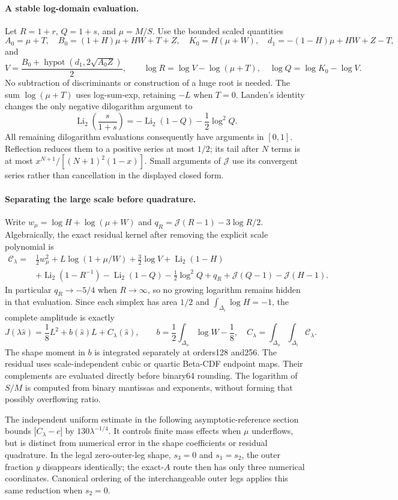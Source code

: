\paragraph{A stable log-domain evaluation.}
Let $R=1+r$, $Q=1+s$, and $\mu=M/S$. Use the bounded scaled quantities
\[
 A_0=\mu+T,\quad B_0=(1+H)\mu+HW+T+Z,\quad K_0=H(\mu+W),
 \quad d_1=-(1-H)\mu+HW+Z-T,
\]
and
\[
 V=\frac{B_0+\operatorname{hypot}(d_1,2\sqrt{A_0Z})}{2},\qquad
 \log R=\log V-\log(\mu+T),\quad \log Q=\log K_0-\log V.
\]
No subtraction of discriminants or construction of a huge root is needed.
The sum $\log(\mu+T)$ uses log-sum-exp, retaining $-L$ when $T=0$.
Landen's identity changes the only negative dilogarithm argument to
\[
 \operatorname{Li}_2\left(\frac{s}{1+s}\right)
 =-\operatorname{Li}_2(1-Q)-\frac12\log^2Q.
\]
All remaining dilogarithm evaluations consequently have arguments in
$[0,1]$. Reflection reduces them to a positive series at most $1/2$; its
tail after $N$ terms is at most
$x^{N+1}/[(N+1)^2(1-x)]$. Small arguments of $\mathcal J$ use its
convergent series rather than cancellation in the displayed closed form.

\paragraph{Separating the large scale before quadrature.}
Write $w_\mu=\log H+\log(\mu+W)$ and
$q_R=\mathcal J(R-1)-3\log R/2$. Algebraically, the exact residual kernel
after removing the explicit scale polynomial is
\begin{align*}
 \mathcal C_\lambda={}&\frac12w_\mu^2
 +L\log(1+\mu/W)+\frac32\log V+\operatorname{Li}_2(1-H)\\
 &+\operatorname{Li}_2(1-R^{-1})-\operatorname{Li}_2(1-Q)
 -\frac12\log^2Q+q_R+\mathcal J(Q-1)-\mathcal J(H-1).
\end{align*}
In particular $q_R\to-5/4$ when $R\to\infty$, so no growing logarithm
remains hidden in that evaluation. Since each simplex has area $1/2$ and
$\int_{\Delta_i}\log H=-1$, the complete amplitude is exactly
\[
 J(\lambda\widehat s)=\frac18L^2+b(\widehat s)L+C_\lambda(\widehat s),
 \qquad
 b=\frac12\int_{\Delta_o}\log W-\frac18,
 \quad C_\lambda=\int_{\Delta_o}\int_{\Delta_i}\mathcal C_\lambda.
\]
The shape moment in $b$ is integrated separately at orders128 and256.
The residual uses scale-independent cubic or quartic Beta-CDF endpoint
maps. Their complements are evaluated directly before binary64 rounding.
The logarithm of $S/M$ is computed from binary mantissas and exponents,
without forming that possibly overflowing ratio.

The independent uniform estimate in the following asymptotic-reference
section bounds $|C_\lambda-c|$ by $130\lambda^{-1/4}$. It controls finite
mass effects when $\mu$ underflows, but is distinct from numerical error in
the shape coefficients or residual quadrature. In the legal zero-outer-leg
shape, $s_3=0$ and $s_1=s_2$, the outer fraction $y$ disappears identically;
the exact-$A$ route then has only three numerical coordinates. Canonical
ordering of the interchangeable outer legs applies this same reduction
when $s_2=0$.
